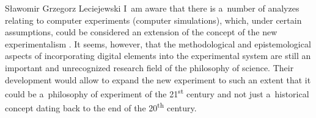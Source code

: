 \begin{artengenv}{Sławomir Grzegorz Leciejewski}
I~am aware that there is a~number of analyzes relating to computer experiments (computer simulations), which, under certain assumptions, could be considered an extension of the concept of the new experimentalism 
\parencite[][]{bartz-beielstein_new_2005}. %
 It seems, however, that the methodological and epistemological aspects of incorporating digital elements into the experimental system are still an important and unrecognized research field of the philosophy of science. Their development would allow to expand the new experiment to such an extent that it could be a~philosophy of experiment of the 21\textsuperscript{st} century and not just a~historical concept dating back to the end of the 20\textsuperscript{th} century.

\enlargethispage{1.5\baselineskip}

\end{artengenv}

